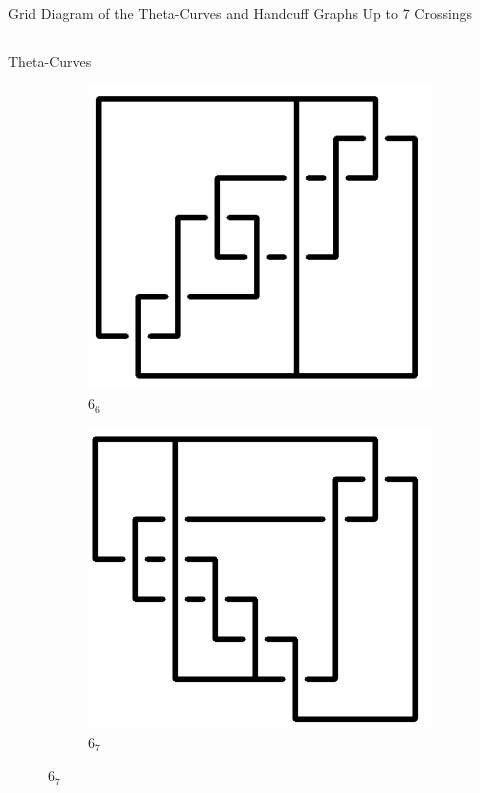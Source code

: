 \documentclass[final]{beamer}
\begin{document}
\begin{frame}[t]
\begin{alertblock}{Grid Diagram of the Theta-Curves and Handcuff Graphs Up to 7 Crossings}
\begin{columns}[t]
\begin{column}{0.5\textwidth}
\begin{alertblock}{Theta-Curves}
\begin{figure}
    \begin{subfigure}{0.075\textwidth}
    \includegraphics[width=\columnwidth]{../Midterm_Poster/grid_diagram/theta_6_6.png}
    \caption{$6_6$} 
    \end{subfigure}
    \begin{subfigure}{0.075\textwidth}
    \includegraphics[width=\columnwidth]{../Midterm_Poster/grid_diagram/theta_6_7.png}
    \caption{$6_7$} 
    \end{subfigure}

\end{figure}
\end{alertblock}
\end{column}
\end{columns}
\end{alertblock}
\end{frame}
\end{document}
